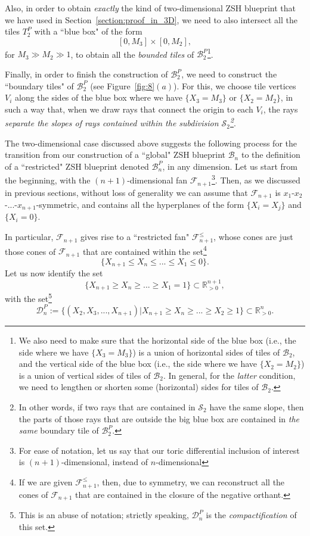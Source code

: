 \documentclass[12pt,letterpaper]{article}
\renewcommand{\S}{\mathcal{S}}
\newcommand{\B}{\mathcal{B}}
\newcommand{\D}{\mathcal{D}}
\newcommand{\F}{\mathcal{F}}
\newcommand{\RRp}{\mathbb{R}_{>0}}
\begin{document}
Also, in order to obtain {\em exactly} the kind of two-dimensional ZSH blueprint that we have used in Section~\ref{section:proof_in_3D}, we need to also intersect all the tiles $T_2^P$ with a ``blue box"  of the form 
$$
[0,M_3] \times [0,M_2],
$$
for $M_3 \gg M_2 \gg 1$, to obtain all the {\em bounded tiles} of $\B_2^P$\footnote{We also need to make sure that the horizontal side of the blue box (i.e., the side where we have  $\{ X_3 = M_3 \}$) is a union of horizontal sides of tiles of $\B_2$, and the vertical side of the blue box (i.e., the side where we have  $\{ X_2 = M_2 \}$)  is a union of vertical sides of tiles of $\B_2$. In general, for the {\em latter} condition, we need to lengthen or shorten some (horizontal) sides for tiles of $\B_2$.}. 

Finally, in order to finish the construction of $\B_2^P$, we need to construct the ``boundary tiles" of $\B_2^P$ (see Figure~\ref{fig:8}$(a)$). For this, we choose tile vertices $V_i$ along the sides of the blue box where we have $\{ X_3 = M_3 \}$ or  $\{ X_2 = M_2 \}$, in such a 
way that, when we draw rays that connect the origin to each $V_i$, the rays {\em separate the slopes of rays contained within the subdivision $\S_2$\footnote{In other words, if two rays that are contained in $\S_2$ have the same slope, then the parts of those rays that are outside the big blue box are contained in {\em the same} boundary tile of $\B_2^P$.}}.

\medskip

The two-dimensional case discussed above suggests the following process for the transition from our construction of a ``global" ZSH blueprint $\B_n$ to the definition of a ``restricted" ZSH blueprint denoted  $\B_n^P$, in any dimension. Let us start from the beginning, with the $(n+1)$-dimensional fan $\F_{n+1}$\footnote{For ease of notation, let us say  that our toric differential inclusion of interest is $(n+1)$-dimensional,  instead of $n$-dimensional}. Then, as we discussed in previous sections, without loss of generality we can assume that  $\F_{n+1}$ is $x_1$-$x_2$-...-$x_{n+1}$-symmetric, and contains all the hyperplanes of the form $\{ X_i = X_j \}$ and $\{ X_i = 0 \}$.


In particular, $\F_{n+1}$ gives rise to a ``restricted fan"  $\F_{n+1}^\le$, whose cones are just those cones of $\F_{n+1}$ that are contained within the set\footnote{If we are given $\F_{n+1}^\le$, then, due to symmetry, we can reconstruct all the cones of $\F_{n+1}$ that are contained in the closure of  the negative orthant.} 
$$
\{  X_{n+1} \le X_n \le ... \le X_1 \le 0  \}. 
$$ 
Let us now  identify the set
$$
\{  X_{n+1} \ge X_n \ge ... \ge X_1 =1  \} \subset \RRp^{n+1},
$$
with the set\footnote{This is an abuse of notation; strictly speaking, $\D_n^P$ is the {\em compactification} of this set.} 
$$
\D_n^P := \{ (X_2, X_3, ..., X_{n+1}) |  X_{n+1} \ge X_n \ge ... \ge X_2 \ge 1  \} \subset \RRp^n.
$$
\end{document}

